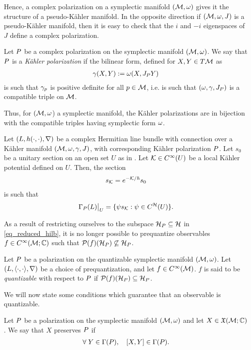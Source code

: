 \documentclass[notas.tex]{subfiles}
\begin{document}
Hence, a complex polarization on a symplectic manifold $(\mathcal{M}, \omega)$ gives it the structure of a pseudo-Kähler manifold. In the opposite direction if $(\mathcal{M}, \omega, J)$ is a pseudo-Kähler manifold, then it is easy to check that the $i$ and $-i$ eigenspaces of $J$ define a complex polarization.
\begin{defn} \label{def_kahler_polarization}
	Let $P$ be a complex polarization on the symplectic manifold $(\mathcal{M}, \omega)$. We say that $P$ is a \emph{Kähler polarization} if the bilinear form, defined for $X,Y \in T\mathcal{M}$ as
	\begin{align*}
		\gamma(X,Y) := \omega(X,J_P Y)
	\end{align*}
	is such that $\gamma_p$ is positive definite for all $p \in \mathcal{M}$, i.e. is such that $(\omega, \gamma, J_P)$ is a compatible triple on $\mathcal{M}$.
\end{defn}


Thus, for $(\mathcal{M}, \omega$) a symplectic manifold, the Kähler polarizations are in bijection with the compatible triples having symplectic form $\omega$.

\begin{prop} \label{prop_polarized_holo_sections}
	Let $(L, h(\cdot,\cdot), \nabla)$ be a complex Hermitian line bundle with connection over a Kähler manifold $(\mathcal{M}, \omega, \gamma, J)$, with corresponding Kähler polarization $P$. Let $s_0$ be a unitary section on an open set $U$ as in . Let $\mathcal{K} \in C^\infty(U)$ be a local Kähler potential defined on $U$. Then, the section
	\begin{align*}
		s_{\mathcal{K}} = e^{-\mathcal{K}/\hbar} s_0
	\end{align*}
	is such that
	\begin{align*}
		\Gamma_P(L)\big|_U = \{\psi s_{\mathcal{K}}: \psi \in C^{\mathcal{H}}(U)\}.
	\end{align*}
\end{prop}
As a result of restricting ourselves to the subspace $\mathcal{H}_P \subseteq \mathcal{H}$ in \eqref{eq_reduced_hilb}, it is no longer possible to prequantize observables $f \in C^\infty(\mathcal{M}; \mathbb{C})$ such that $\mathcal{P}(f)(\mathcal{H}_P) \not\subseteq \mathcal{H}_P$.
\begin{defn}\label{def_observable_quantizable}
	Let $P$ be a polarization on the quantizable symplectic manifold $(\mathcal{M}, \omega)$. Let $(L, \langle \cdot,\cdot \rangle, \nabla)$ be a choice of prequantization, and let $f \in C^\infty(\mathcal{M})$. $f$ is said to be \emph{quantizable} with respect to $P$ if $\mathcal{P}(f)(\mathcal{H}_P) \subseteq \mathcal{H}_P$.
\end{defn}
We will now state some conditions which guarantee that an observable is quantizable.
\begin{defn}
	Let $P$ be a polarization on the symplectic manifold $(\mathcal{M}, \omega)$ and let $X \in \mathfrak{X}(\mathcal{M}; \mathbb{C})$. We say that $X$ preserves $P$ if
	\begin{align*}
		\forall Y \in \sect(\pol), \quad \lb{X}{Y} \in \sect(\pol).
	\end{align*}
\end{defn}
\end{document}
